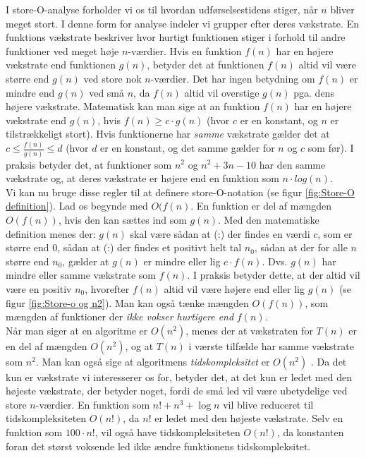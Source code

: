 I store-O-analyse forholder vi os til hvordan udførselsestidens stiger, når $n$ bliver meget stort. I denne form for analyse indeler vi grupper efter deres vækstrate. En funktions vækstrate beskriver hvor hurtigt funktionen stiger i forhold til andre funktioner ved meget høje $n$-værdier. Hvis en funktion $f(n)$ har en højere vækstrate end funktionen $g(n)$, betyder det at funktionen $f(n)$ altid vil være større end $g(n)$ ved store nok $n$-værdier. Det har ingen betydning om $f(n)$ er mindre end $g(n)$ ved små $n$, da $f(n)$ altid vil overstige $g(n)$ pga. dens højere vækstrate. Matematisk kan man sige at an funktion $f(n)$ har en højere vækstrate end $g(n)$, hvis $f(n) \geq c \cdot g(n)$  (hvor $c$ er en konstant, og $n$ er tilstrækkeligt stort). Hvis funktionerne har \emph{samme} vækstrate gælder det at $c \leq \frac{f(n)}{g(n)} \leq d$ (hvor $d$ er en konstant, og det samme gælder for $n$ og $c$ som før). I praksis betyder det, at funktioner som $n^2$ og $n^2+3n-10$ har den samme vækstrate og, at deres vækstrate er højere end en funktion som $n \cdot log(n)$.\\

Vi kan nu bruge disse regler til at definere store-O-notation (se figur \ref{fig:Store-O definition}). Lad os begynde med $O(f(n)$. En funktion er del af mængden $O(f(n))$, hvis den kan sættes ind som $g(n)$. Med den matematiske definition menes der: $g(n)$ skal være sådan at (:) der findes en værdi $c$, som er større end $0$, sådan at (:) der findes et positivt helt tal $n_0$, sådan at der for alle $n$ større end $n_0$, gælder at $g(n)$ er mindre eller lig $c \cdot f(n)$. Dvs. $g(n)$ har mindre eller samme vækstrate som $f(n)$. I praksis betyder dette, at der altid vil være en positiv $n_0$, hvorefter $f(n)$ altid vil være højere end eller lig $g(n)$ (se figur \ref{fig:Store-o og n2}). Man kan også tænke mængden $O(f(n))$, som mængden af funktioner der \emph{ikke vokser hurtigere end} $f(n)$.\\

Når man siger at en algoritme er $O(n^2)$, menes der at vækstraten for $T(n)$ er en del af mængden $O(n^2)$, og at $T(n)$ i værste tilfælde har samme vækstrate som $n^2$. Man kan også sige at algoritmens \emph{tidskompleksitet} er $O(n^2)$ \cite{time-complexity-use}. Da det kun er vækstrate vi interesserer os for, betyder det, at det kun er ledet med den højeste vækstrate, der betyder noget, fordi de små led vil være ubetydelige ved store $n$-værdier. En funktion som $n! + n^3+\log n$ vil blive reduceret til tidskompleksiteten $O(n!)$, da $n!$ er ledet med den højeste vækstrate. Selv en funktion som $100 \cdot n!$, vil også have tidskompleksiteten $O(n!)$, da konstanten foran det størst voksende led ikke ændre funktionens tidskompleksitet.\\

